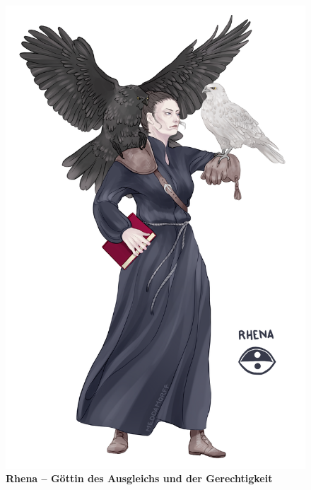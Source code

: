 \begin{figure}[tbh]
\begin{minipage}{0.49\textwidth}
		\centering
		\vspace{0pt}
		\includegraphics[width=0.94\linewidth]{Abbildungen/Gesellschaft/Religion/rhena}
		\captionsetup{width=0.95\linewidth}
		\caption[Rhena -- Göttin des Ausgleichs und der Gerechtigkeit]{\textbf{Rhena -- Göttin des Ausgleichs und der Gerechtigkeit}}
		\label{fig:rhena}
	\end{minipage}
\end{figure}


